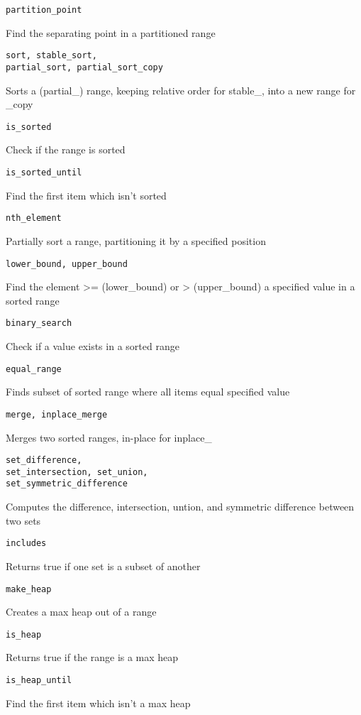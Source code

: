 \begin{multicols}{2}
\begin{lstlisting}
partition_point
\end{lstlisting}
Find the separating point in a partitioned range
\begin{lstlisting}
sort, stable_sort,
partial_sort, partial_sort_copy
\end{lstlisting}
Sorts a (partial\_) range, keeping relative order for stable\_, into a new range
for \_copy
\begin{lstlisting}
is_sorted
\end{lstlisting}
Check if the range is sorted
\begin{lstlisting}
is_sorted_until
\end{lstlisting}
Find the first item which isn't sorted
\begin{lstlisting}
nth_element
\end{lstlisting}
Partially sort a range, partitioning it by a specified position
\begin{lstlisting}
lower_bound, upper_bound
\end{lstlisting}
Find the element >= (lower\_bound) or > (upper\_bound) a specified value in a
sorted range
\begin{lstlisting}
binary_search
\end{lstlisting}
Check if a value exists in a sorted range
\begin{lstlisting}
equal_range
\end{lstlisting}
Finds subset of sorted range where all items equal specified value
\begin{lstlisting}
merge, inplace_merge
\end{lstlisting}
Merges two sorted ranges, in-place for inplace\_
\begin{lstlisting}
set_difference,
set_intersection, set_union,
set_symmetric_difference
\end{lstlisting}
Computes the difference, intersection, untion, and symmetric difference between
two sets
\begin{lstlisting}
includes
\end{lstlisting}
Returns true if one set is a subset of another
\begin{lstlisting}
make_heap
\end{lstlisting}
Creates a max heap out of a range
\begin{lstlisting}
is_heap
\end{lstlisting}
Returns true if the range is a max heap
\begin{lstlisting}
is_heap_until
\end{lstlisting}
Find the first item which isn't a max heap

\end{multicols}
